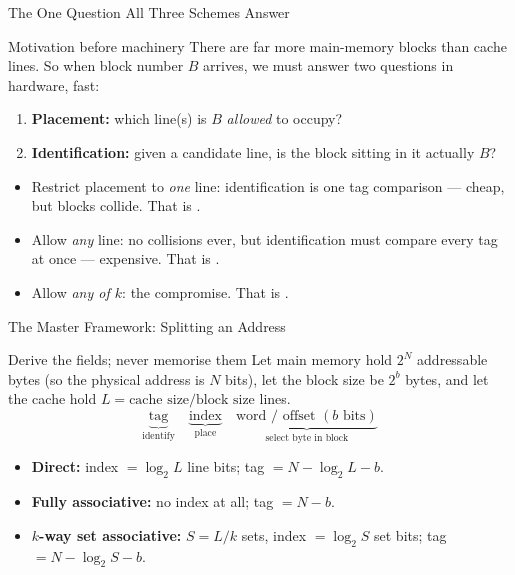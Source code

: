 \documentclass[aspectratio=169]{beamer}
\begin{document}
\begin{frame}{The One Question All Three Schemes Answer}
  \begin{block}{Motivation before machinery}
    There are far more main-memory blocks than cache lines. So when block
    number $B$ arrives, we must answer two questions in hardware, fast:
    \begin{enumerate}
      \item \textbf{Placement:} which line(s) is $B$ \emph{allowed} to occupy?
      \item \textbf{Identification:} given a candidate line, is the block
        sitting in it actually $B$?
    \end{enumerate}
  \end{block}
  \begin{itemize}
    \item Restrict placement to \emph{one} line: identification is one tag
      comparison --- cheap, but blocks collide. That is .
    \item Allow \emph{any} line: no collisions ever, but identification must
      compare every tag at once --- expensive. That is .
    \item Allow \emph{any of $k$}: the compromise. That is .
  \end{itemize}
\end{frame}

\begin{frame}{The Master Framework: Splitting an Address}
  \begin{block}{Derive the fields; never memorise them}
    Let main memory hold $2^N$ addressable bytes (so the physical address is
    $N$ bits), let the block size be $2^b$ bytes, and let the cache hold
    $L = \text{cache size} / \text{block size}$ lines.
    \[
      \underbrace{\text{tag}}_{\text{identify}}\quad
      \underbrace{\text{index}}_{\text{place}}\quad
      \underbrace{\text{word / offset } (b \text{ bits})}_{\text{select byte in block}}
    \]
    \vspace{-0.35cm}
    \begin{itemize}
      \item \textbf{Direct:} index $=\log_2 L$ line bits; tag $= N - \log_2 L - b$.
      \item \textbf{Fully associative:} no index at all; tag $= N - b$.
      \item \textbf{$k$-way set associative:} $S = L/k$ sets, index
        $=\log_2 S$ set bits; tag $= N - \log_2 S - b$.
    \end{itemize}
  \end{block}
  \cite[\S5.2, PDF pp.~187--203]{Stallings2015_computer_organization}
\end{frame}
\end{document}

